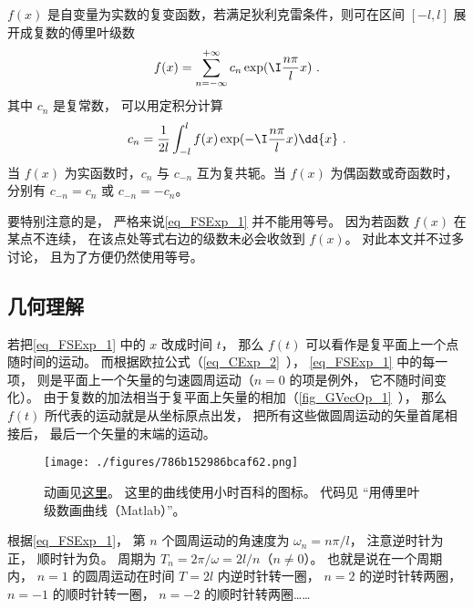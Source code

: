 
$f(x)$ 是自变量为实数的复变函数，若满足狄利克雷条件，则可在区间 $[- l,l]$ 展开成复数的傅里叶级数
\begin{equation}\label{eq_FSExp_1}
f(x) = \sum_{n =  - \infty }^{ + \infty } c_n \exp ( \I\frac{n\pi }{l}x )~.
\end{equation}
其中 $c_n$ 是复常数， 可以用定积分计算
\begin{equation}\label{eq_FSExp_2}
c_n = \frac{1}{2l} \int_{ - l}^l  f(x)\exp( -\I\frac{n\pi }{l}x ) \dd{x} ~.
\end{equation}
当 $f(x)$ 为实函数时，$c_n$ 与 $c_{-n}$ 互为复共轭。当 $f(x)$ 为偶函数或奇函数时，分别有 $c_{-n} = c_n$ 或 $c_{-n} = -c_n$。

要特别注意的是， 严格来说\autoref{eq_FSExp_1} 并不能用等号。 因为若函数 $f(x)$ 在某点不连续， 在该点处等式右边的级数未必会收敛到 $f(x)$。 对此本文并不过多讨论， 且为了方便仍然使用等号。

\subsection{几何理解}
若把\autoref{eq_FSExp_1} 中的 $x$ 改成时间 $t$， 那么 $f(t)$ 可以看作是复平面上一个点随时间的运动。 而根据欧拉公式（\autoref{eq_CExp_2}~）， \autoref{eq_FSExp_1} 中的每一项， 则是平面上一个矢量的匀速圆周运动（$n=0$ 的项是例外， 它不随时间变化）。 由于复数的加法相当于复平面上矢量的相加（\autoref{fig_GVecOp_1}~）， 那么 $f(t)$ 所代表的运动就是从坐标原点出发， 把所有这些做圆周运动的矢量首尾相接后， 最后一个矢量的末端的运动。

\begin{figure}[ht]
\centering
\texttt{[image: ./figures/786b152986bcaf62.png]}
\caption{动画见\href{https://wuli.wiki/apps/FFTplt.html}{这里}。 这里的曲线使用小时百科的图标。 代码见 “用傅里叶级数画曲线（Matlab）”。} \label{fig_FSExp_1}
\end{figure}

根据\autoref{eq_FSExp_1}， 第 $n$ 个圆周运动的角速度为 $\omega_n = n\pi/l$， 注意逆时针为正， 顺时针为负。 周期为 $T_n = 2\pi/\omega = 2l/n$（$n\ne 0$）。 也就是说在一个周期内， $n=1$ 的圆周运动在时间 $T = 2l$ 内逆时针转一圈， $n=2$ 的逆时针转两圈， $n=-1$ 的顺时针转一圈， $n=-2$ 的顺时针转两圈……

